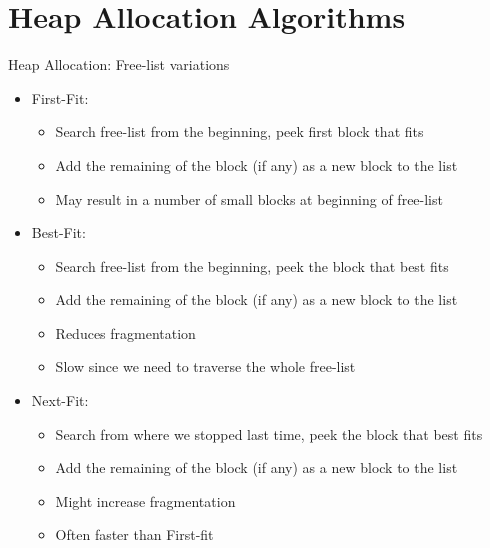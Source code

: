 \documentclass[
14pt,
aspectratio=169,
usenames,
dvipsnames,
x11names]{beamer}
\begin{document}
\section{Heap Allocation Algorithms}

\begin{frame}{Heap Allocation: Free-list variations }
  \begin{itemize}  \setlength{\itemsep}{\fill}
  \item \alert{First-Fit}:
    \begin{itemize}
    \item Search free-list from the beginning, peek first block that fits
    \item Add the remaining of the block (if any) as a new block to the list
    \item May result in a number of small blocks at beginning of free-list
    \end{itemize}
  \item \alert{Best-Fit}:
    \begin{itemize}
    \item Search free-list from the beginning, peek the block that best fits
    \item Add the remaining of the block (if any) as a new block to the list
    \item Reduces fragmentation
    \item Slow since we need to traverse the whole free-list
    \end{itemize}
  \item \alert{Next-Fit}:
    \begin{itemize}
    \item Search from where we stopped last time, peek the block that best fits
    \item Add the remaining of the block (if any) as a new block to the list
    \item Might increase fragmentation
    \item Often faster than First-fit
    \end{itemize}
  \end{itemize}
\end{frame}
\end{document}
